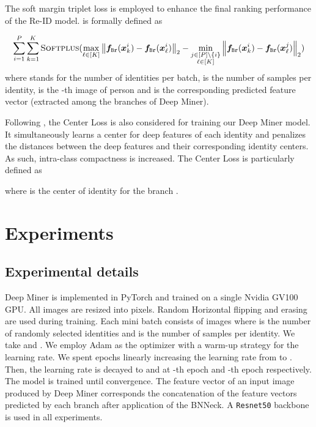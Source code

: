 \documentclass[final]{cvpr}
\def\vf{{\bm{f}}}
\def\vx{{\bm{x}}}
\begin{document}
The soft margin triplet loss  is employed to enhance the final ranking performance of the Re-ID model.  is formally defined as 

\begin{dmath}
     \sum_{i=1}^{P} \sum_{k=1}^{K} \textsc{Softplus} ( \max_{\ell\in [K]} \left\Vert \vf_{\texttt{Br}}(\vx_k^i) - \vf_{\texttt{Br}}(\vx^i_\ell) \right\Vert_2 - \min_{ \substack{j\in [P]\setminus\{i\} \\ \ell\in [K] }} \left\Vert \vf_{\texttt{Br}}(\vx^i_k) - \vf_{\texttt{Br}}(\vx^j_\ell) \right\Vert_2 )
\end{dmath}
where  stands for the number of identities per batch,  is the number of samples per identity,  is the -th image of person  and  is the corresponding predicted feature vector (extracted among the branches of Deep Miner). 

Following \cite{luo2019bag}, the Center Loss  is also considered for training our Deep Miner model. It simultaneously learns a center
for deep features of each identity and penalizes the distances
between the deep features and their corresponding identity
centers. As such, intra-class compactness is increased. The Center Loss is particularly defined as

where  is the center of identity  for the branch .

\section{Experiments}
\subsection{Experimental details} Deep Miner is implemented in PyTorch and trained on a single Nvidia GV100 GPU. All images are resized into  pixels. Random Horizontal flipping and erasing are used during training. Each mini batch consists of  images where  is the number of randomly selected identities and  is the number of samples per identity. We take  and . We employ Adam as the optimizer with a warm-up strategy for the learning rate.  We spent  epochs linearly increasing the learning rate from  to . Then, the learning rate is decayed to 
and  at -th epoch and -th epoch respectively. The model is trained until convergence. The feature vector of an input image produced by Deep Miner corresponds the concatenation of the feature vectors predicted by each branch after application of the BNNeck. A \texttt{Resnet50} backbone is used in all experiments. 
\end{document}
